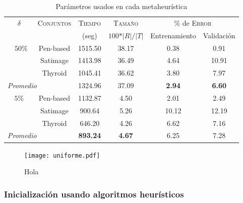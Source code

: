 \blindtext

\begin{table}[h!]
\centering
\begin{tabular}{c c c c c c}
\hline
\multirow{2}{*}{$\delta$}
	& \multirow{2}{*}{\textsc{Conjuntos}}
	& \textsc{Tiempo} & \textsc{Tamaño}
	& \multicolumn{2}{c}{$\%$ de \textsc{Error}} \\\cline{5-6}
 & & \scriptsize{(seg)} & \scriptsize{$100*\vert R \vert / \vert T \vert$}
	& \scriptsize{Entrenamiento} & \scriptsize{Validación} \\
\hline
\hline
\multirow{3}{*}{\ \ $50\%\ \ $}
 & Pen-based & 1515.50 & 38.17 & 0.38 &  0.91 \\
 & Satimage  & 1413.98 & 36.49 & 4.64 & 10.91 \\
 & Thyroid   & 1045.41 & 36.62 & 3.80 &  7.97 \\
\hline
\multicolumn{2}{l}{\emph{Promedio}} & 1324.96 & 37.09 & \textbf{2.94} & \textbf{6.60} \\
\hline
\multirow{3}{*}{$5\%$}
 & Pen-based & 1132.87 & 4.50 &  2.01 &  2.49 \\
 & Satimage  &  900.64 & 5.26 & 10.12 & 12.19 \\
 & Thyroid   &  646.20 & 4.26 &  6.62 &  7.16 \\
\hline
\multicolumn{2}{l}{\emph{Promedio}} & \textbf{893.24} & \textbf{4.67} & 6.25 & 7.28 \\
\hline
\end{tabular}
\caption{Parámetros usados en cada metaheurística}
\label{table-unif50vs5}
\end{table}

\blindtext

\begin{figure}[h!]
\centering
\texttt{[image: uniforme.pdf]}
\caption{Hola}
\label{fig-unif}
\end{figure}

\subsubsection{Inicialización usando algoritmos heurísticos}

\blindtext

